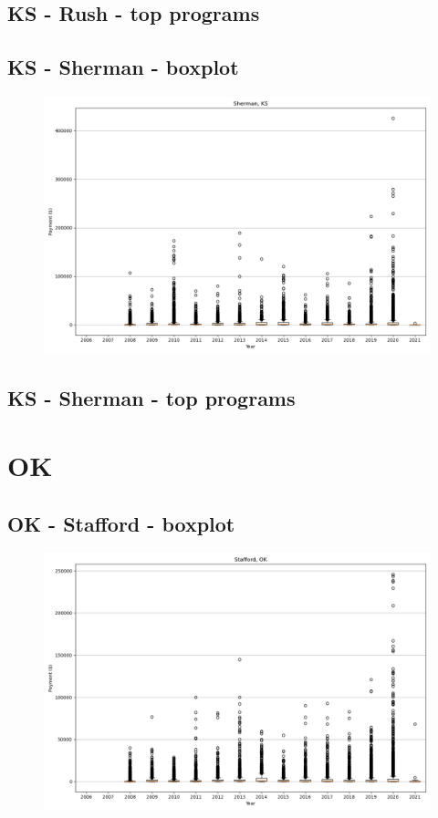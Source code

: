 \subsection*{KS - Rush - top programs}

\newpage
\subsection*{KS - Sherman - boxplot}
\begin{figure}[h]
\centering
\includegraphics[width=7in]{../output/boxplots/counties/Sherman-KS_boxplot.png}
\end{figure}


\subsection*{KS - Sherman - top programs}

\newpage
\section*{OK}
\subsection*{OK - Stafford - boxplot}
\begin{figure}[h]
\centering
\includegraphics[width=7in]{../output/boxplots/counties/Stafford-OK_boxplot.png}
\end{figure}


